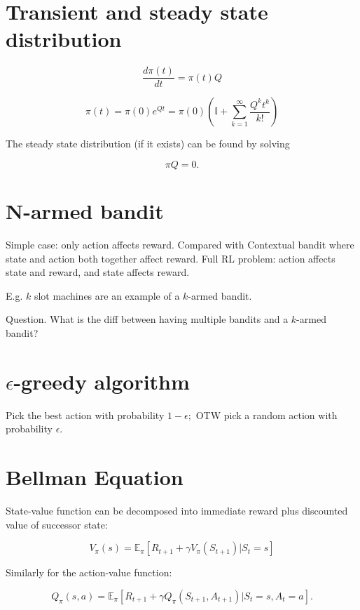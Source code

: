 \documentclass[20pt]{extarticle}
\theoremstyle{plain}
\theoremstyle{definition}
\theoremstyle{remark}
\newcommand{\0}{\varnothing}
\newcommand{\<}{\langle}
\renewcommand{\>}{\rangle}
\begin{document}
\section{Transient and steady state distribution}


\[
\frac { d \pi ( t ) } { d t } = \pi ( t ) Q
\]

\[
\pi ( t ) = \pi ( 0 ) e ^ { Q t } = \pi ( 0 ) \left( \mathbb { I } + \sum _ { k = 1 } ^ { \infty } \frac { Q ^ { k } t ^ { k } } { k ! } \right)
\]

The steady state distribution (if it exists) can be found by solving

\[
\pi Q = 0.
\]


\section{N-armed bandit}


Simple case: only action affects reward. Compared with Contextual bandit where
state and action both together affect reward. Full RL problem: action affects
state and reward, and state affects reward.

E.g. \( k \) slot machines are an example of a \( k \)-armed bandit.

Question. What is the diff between having multiple bandits and a \( k \)-armed
bandit?

\section{\( \epsilon \)-greedy algorithm}

Pick the best action with probability \( 1 - \epsilon; \) OTW pick a random
action with probability $ \epsilon. $

\section{Bellman Equation}


State-value function can be decomposed into immediate reward plus discounted value of successor state:


\[
V _ { \pi } ( s ) = \mathbb { E } _ { \pi } \left[ R _ { t + 1 } + \gamma V _ { \pi } \left( S _ { t + 1 } \right) | S _ { t } = s \right]
\]

Similarly for the action-value function:

\[
Q _ { \pi } ( s , a ) = \mathbb { E } _ { \pi } \left[ R _ { t + 1 } + \gamma Q _ { \pi } \left( S _ { t + 1 } , A _ { t + 1 } \right) | S _ { t } = s , A _ { t } = a \right].
\]
\end{document}
